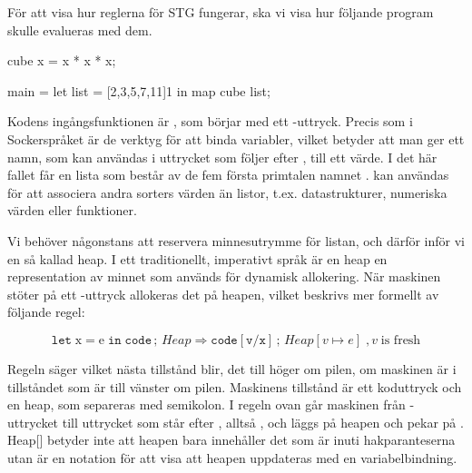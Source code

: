 \documentclass[../Core]{subfiles}
\begin{document}


För att visa hur reglerna
för STG  fungerar, ska vi visa hur följande program skulle evalueras med dem.

\begin{codeEx}
cube x = x * x * x;

main = let list = [2,3,5,7,11]1
        in map cube list;
\end{codeEx}

Kodens ingångsfunktionen är , som börjar med ett -uttryck.
Precis som i Sockerspråket är de verktyg för att binda variabler, vilket betyder att man ger ett
namn, som kan användas i uttrycket som följer efter ,
till ett värde. I det här fallet får
en lista som består av de fem första primtalen namnet .
 kan användas för att associera andra sorters värden än listor,
t.ex. datastrukturer, numeriska värden eller funktioner.

Vi behöver någonstans att reservera minnesutrymme för listan, och därför
inför vi en så kallad heap. I ett traditionellt, imperativt språk är
en heap en representation av minnet som används för dynamisk allokering. När
maskinen stöter på ett -uttryck allokeras det på heapen, vilket
beskrivs mer formellt av följande regel:


\[
\mathtt{let\;\mathrm{x\mathtt{=}e}\; in\; code}\,;\, Heap\Rightarrow\mathtt{code[v/x]}\,;\, Heap[v\mapsto e] \;, v\; \textrm{is fresh}
\]

Regeln säger vilket nästa tillstånd blir, det till höger om pilen,
om maskinen är i tillståndet som är till vänster om pilen.
Maskinens tillstånd är ett koduttryck och en heap, som separeras med
semikolon. I regeln ovan går maskinen från -uttrycket till
uttrycket som står efter , alltså ,
och  läggs på heapen och pekar på .
Heap{[}{]} betyder inte att heapen bara innehåller det som är inuti
hakparanteserna utan är en notation för att visa att heapen
uppdateras med en variabelbindning.
\end{document}
